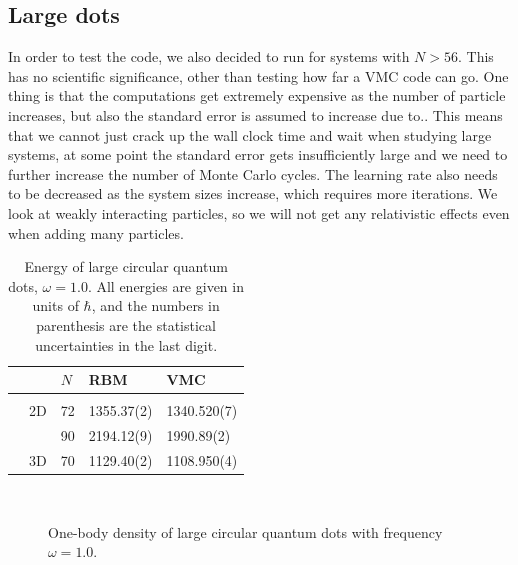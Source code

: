 \subsection{Large dots}
In order to test the code, we also decided to run for systems with $N>56$. This has no scientific significance, other than testing how far a VMC code can go. One thing is that the computations get extremely expensive as the number of particle increases, but also the standard error is assumed to increase due to.. This means that we cannot just crack up the wall clock time and wait when studying large systems, at some point the standard error gets insufficiently large and we need to further increase the number of Monte Carlo cycles. The learning rate also needs to be decreased as the system sizes increase, which requires more iterations.  We look at weakly interacting particles, so we will not get any relativistic effects even when adding many particles.

\begin{table}[H]
	\caption{Energy of large circular quantum dots, $\omega=1.0$. All energies are given in units of $\hbar$, and the numbers in parenthesis are the statistical uncertainties in the last digit.}
	\label{tab:largeQD}
	\begin{tabularx}{\textwidth}{R{1.6cm}R{2cm}R{2cm}R{3cm}R{3cm}} \hline\hline
		& \makecell{\\ \phantom{$N$} \\ \phantom{=}} & $N$ & RBM & VMC \\ \hline \\
		& 2D & 72 & 1355.37(2) & 1340.520(7) \\
		&& 90 & 2194.12(9) & 1990.89(2) \\
		& 3D & 70 & 1129.40(2) & 1108.950(4) \\
		\hline \hline
	\end{tabularx}
\end{table}

\begin{figure}[H]
	\centering
	\captionsetup[subfigure]{labelformat=empty}
	\\
	\caption{One-body density of large circular quantum dots with frequency $\omega=1.0$.}
	\label{fig:largedotsOB}
\end{figure}

